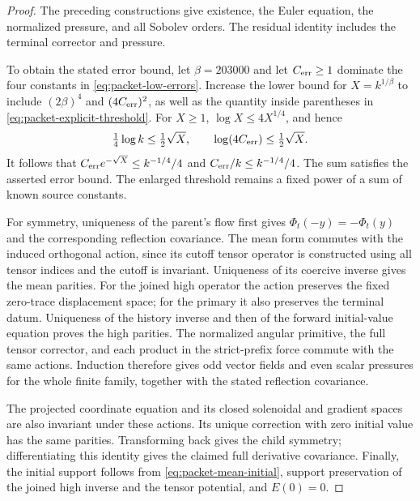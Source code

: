 \documentclass[11pt]{article}
\theoremstyle{definition}
\begin{document}
\begin{proof}
The preceding constructions give existence, the Euler equation,
the normalized pressure, and all Sobolev orders. The residual identity
includes the terminal corrector and pressure.

To obtain the stated error bound, let
$\beta=203000$ and let $C_{\rm err}\ge1$ dominate the four constants in
\eqref{eq:packet-low-errors}. Increase the lower bound for $X=k^{1/\beta}$
to include $(2\beta)^4$ and $(4C_{\rm err})^2$, as well as the quantity
inside parentheses in \eqref{eq:packet-explicit-threshold}.
For $X\ge1$, $\log X\le4X^{1/4}$, and hence
\[
 \tfrac14\log k\le\tfrac12\sqrt X,
 \qquad \log(4C_{\rm err})\le\tfrac12\sqrt X.
\]
It follows that
$C_{\rm err}e^{-\sqrt X}\le k^{-1/4}/4$ and
$C_{\rm err}/k\le k^{-1/4}/4$. The sum satisfies the asserted error
bound. The enlarged threshold remains a fixed power of a sum of known
source constants.

For symmetry, uniqueness of the parent's flow first gives
$\Phi_t(-y)=-\Phi_t(y)$ and the corresponding reflection covariance.
The mean form commutes with the induced orthogonal action, since its
cutoff tensor operator is constructed using all tensor indices and the
cutoff is invariant. Uniqueness of its coercive inverse gives the mean
parities. For the joined high operator the action preserves the fixed
zero-trace displacement space; for the primary it also preserves the
terminal datum. Uniqueness of the history inverse and then of the
forward initial-value equation proves the high parities. The normalized
angular primitive, the full tensor corrector, and each product
in the strict-prefix force commute with the same actions. Induction
therefore gives odd vector fields and even scalar pressures for the
whole finite family, together with the stated reflection covariance.

The projected coordinate equation and its closed solenoidal and gradient
spaces are also invariant under these actions. Its unique correction
with zero initial value has the same parities. Transforming back gives
the child symmetry; differentiating this identity gives the
claimed full derivative covariance. Finally, the initial support
follows from \eqref{eq:packet-mean-initial}, support preservation of the
joined high inverse and the tensor potential, and $E(0)=0$.
\end{proof}
\end{document}
